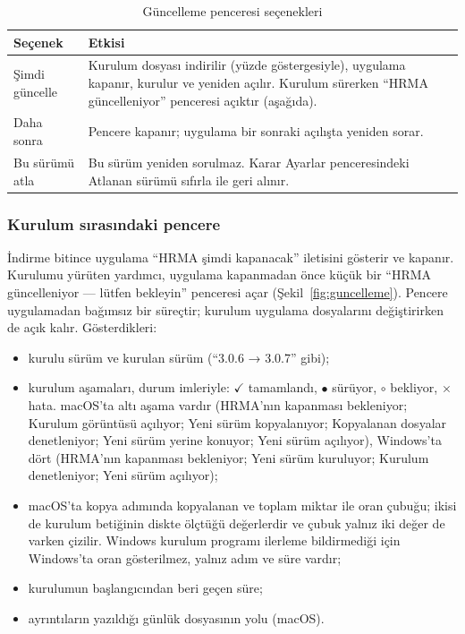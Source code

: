 \documentclass[11pt,a4paper]{article}
\newcommand{\ui}[1]{\textsf{#1}}
\begin{document}
\begin{table}[htbp]
\centering\small
\caption{Güncelleme penceresi seçenekleri}\label{tab:guncelleme}
\begin{tabular}{@{}>{\raggedright\arraybackslash}p{3.6cm}>{\raggedright\arraybackslash}p{12.0cm}@{}}
\toprule
\textbf{Seçenek} & \textbf{Etkisi} \\
\midrule
\ui{Şimdi güncelle} & Kurulum dosyası indirilir (yüzde göstergesiyle), uygulama kapanır, kurulur ve yeniden açılır. Kurulum sürerken ``HRMA güncelleniyor'' penceresi açıktır (aşağıda). \\
\ui{Daha sonra} & Pencere kapanır; uygulama bir sonraki açılışta yeniden sorar. \\
\ui{Bu sürümü atla} & Bu sürüm yeniden sorulmaz. Karar \ui{Ayarlar} penceresindeki \ui{Atlanan sürümü sıfırla} ile geri alınır. \\
\bottomrule
\end{tabular}
\end{table}

\subsubsection*{Kurulum sırasındaki pencere}

İndirme bitince uygulama ``HRMA şimdi kapanacak'' iletisini gösterir ve
kapanır. Kurulumu yürüten yardımcı, uygulama kapanmadan önce küçük bir
``HRMA güncelleniyor --- lütfen bekleyin'' penceresi açar
(Şekil~\ref{fig:guncelleme}). Pencere uygulamadan bağımsız bir süreçtir;
kurulum uygulama dosyalarını değiştirirken de açık kalır. Gösterdikleri:

\begin{itemize}[leftmargin=1.4em]
  \item kurulu sürüm ve kurulan sürüm (``3.0.6 → 3.0.7'' gibi);
  \item kurulum aşamaları, durum imleriyle: $\checkmark$ tamamlandı, $\bullet$ sürüyor,
  $\circ$ bekliyor, $\times$ hata. macOS'ta altı aşama vardır (HRMA'nın kapanması
  bekleniyor; Kurulum görüntüsü açılıyor; Yeni sürüm kopyalanıyor;
  Kopyalanan dosyalar denetleniyor; Yeni sürüm yerine konuyor; Yeni sürüm
  açılıyor), Windows'ta dört (HRMA'nın kapanması bekleniyor; Yeni sürüm
  kuruluyor; Kurulum denetleniyor; Yeni sürüm açılıyor);
  \item macOS'ta kopya adımında kopyalanan ve toplam miktar ile oran
  çubuğu; ikisi de kurulum betiğinin diskte ölçtüğü değerlerdir ve çubuk
  yalnız iki değer de varken çizilir. Windows kurulum programı ilerleme
  bildirmediği için Windows'ta oran gösterilmez, yalnız adım ve süre vardır;
  \item kurulumun başlangıcından beri geçen süre;
  \item ayrıntıların yazıldığı günlük dosyasının yolu (macOS).
\end{itemize}
\end{document}
